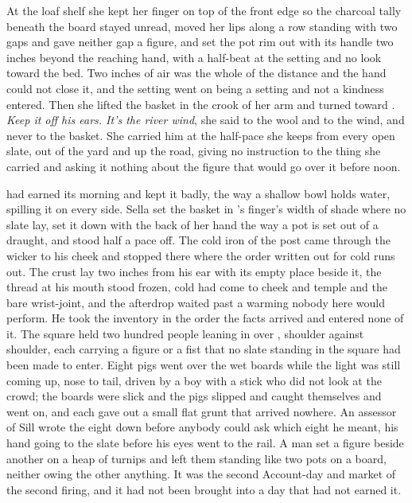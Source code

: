 At the loaf shelf she kept her finger on top of the front edge so the charcoal tally beneath the board stayed unread, moved her lips along a row standing with two gaps and gave neither gap a figure, and set the pot rim out with its handle two inches beyond the reaching hand, with a half-beat at the setting and no look toward the bed. Two inches of air was the whole of the distance and the hand could not close it, and the setting went on being a setting and not a kindness entered. Then she lifted the basket in the crook of her arm and turned toward . \emph{Keep it off his ears. It's the river wind}, she said to the wool and to the wind, and never to the basket. She carried him at the half-pace she keeps from every open slate, out of the yard and up the road, giving no instruction to the thing she carried and asking it nothing about the figure that would go over it before noon.

\scenebreak

 had earned its morning and kept it badly, the way a shallow bowl holds water, spilling it on every side. Sella set the basket in 's finger's width of shade where no slate lay, set it down with the back of her hand the way a pot is set out of a draught, and stood half a pace off. The cold iron of the post came through the wicker to his cheek and stopped there where the order written out for cold runs out. The crust lay two inches from his ear with its empty place beside it, the thread at his mouth stood frozen, cold had come to cheek and temple and the bare wrist-joint, and the afterdrop waited past a warming nobody here would perform. He took the inventory in the order the facts arrived and entered none of it. The square held two hundred people leaning in over , shoulder against shoulder, each carrying a figure or a fist that no slate standing in the square had been made to enter. Eight pigs went over the wet boards while the light was still coming up, nose to tail, driven by a boy with a stick who did not look at the crowd; the boards were slick and the pigs slipped and caught themselves and went on, and each gave out a small flat grunt that arrived nowhere. An assessor of Sill wrote the eight down before anybody could ask which eight he meant, his hand going to the slate before his eyes went to the rail. A man set a figure beside another on a heap of turnips and left them standing like two pots on a board, neither owing the other anything. It was the second Account-day and market of the second firing, and it had not been brought into a day that had not earned it.

